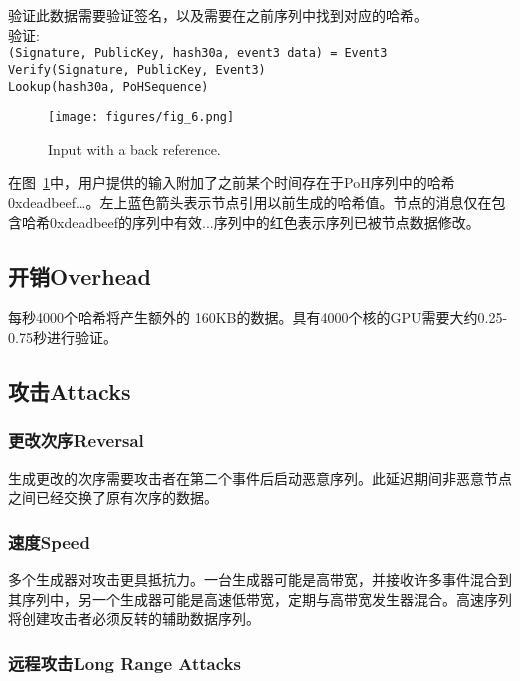 \documentclass[12pt, uft8]{ctexart}
\begin{document}
验证此数据需要验证签名，以及需要在之前序列中找到对应的哈希。\\
\noindent 验证:\\

\noindent\texttt{(Signature, PublicKey, hash30a, event3 data) = Event3} \\
\texttt{Verify(Signature, PublicKey, Event3)}\\
\texttt{Lookup(hash30a, PoHSequence)}\\

\begin{figure}
  \begin{center}
    \centering
    \texttt{[image: figures/fig\_6.png]}
    \caption[Fig 6]{Input with a back reference.\label{fig:poh_consistency}}
  \end{center}
  \end{figure}

在图~\ref{fig:poh_consistency}中，用户提供的输入附加了之前某个时间存在于PoH序列中的哈希0xdeadbeef…。左上蓝色箭头表示节点引用以前生成的哈希值。节点的消息仅在包含哈希0xdeadbeef的序列中有效...序列中的红色表示序列已被节点数据修改。

\subsection{开销Overhead}
每秒4000个哈希将产生额外的 160KB的数据。具有4000个核的GPU需要大约0.25-0.75秒进行验证。

\subsection{攻击Attacks}
\subsubsection{更改次序Reversal}
生成更改的次序需要攻击者在第二个事件后启动恶意序列。此延迟期间非恶意节点之间已经交换了原有次序的数据。

\subsubsection{速度Speed}
多个生成器对攻击更具抵抗力。一台生成器可能是高带宽，并接收许多事件混合到其序列中，另一个生成器可能是高速低带宽，定期与高带宽发生器混合。高速序列将创建攻击者必须反转的辅助数据序列。

\subsubsection{远程攻击Long Range Attacks}
\end{document}
